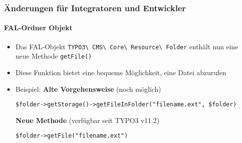 %

\begin{frame}[fragile]
	\frametitle{Änderungen für Integratoren und Entwickler}
	\framesubtitle{FAL-Ordner Objekt}


	\begin{itemize}
		\item Das FAL-Objekt
			\small\texttt{TYPO3\textbackslash
				CMS\textbackslash
				Core\textbackslash
				Resource\textbackslash
				Folder}\normalsize\newline
			enthält nun eine neue Methode
			\small\texttt{getFile()}\normalsize

		\item Diese Funktion bietet eine bequeme Möglichkeit, eine Datei abzurufen
		\item Beispiel:\newline
			\small\textbf{Alte Vorgehensweise} (noch möglich)\normalsize
\begin{lstlisting}
$folder->getStorage()->getFileInFolder("filename.ext", $folder)
\end{lstlisting}
			\small\textbf{Neue Methode} (verfügbar seit TYPO3 v11.2)\normalsize
\begin{lstlisting}
$folder->getFile("filename.ext")
\end{lstlisting}

	\end{itemize}
\end{frame}

